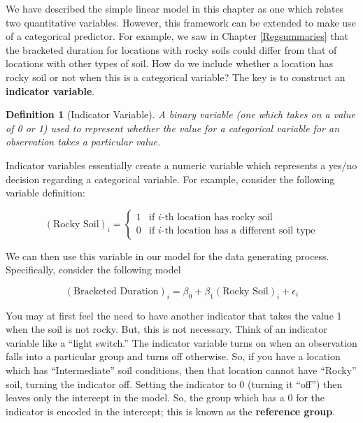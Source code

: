 \documentclass[
]{book}
\theoremstyle{plain}
\theoremstyle{mydefn}
\newtheorem{definition}{Definition}[chapter]
\theoremstyle{myexmpl}
\theoremstyle{remark}
\begin{document}
We have described the simple linear model in this chapter as one which relates two quantitative variables. However, this framework can be extended to make use of a categorical predictor. For example, we saw in Chapter \ref{Regsummaries} that the bracketed duration for locations with rocky soils could differ from that of locations with other types of soil. How do we include whether a location has rocky soil or not when this is a categorical variable? The key is to construct an \textbf{indicator variable}.

\begin{definition}[Indicator Variable]
\protect\hypertarget{def:defn-indicator-variable}{}{\label{def:defn-indicator-variable} {} }A binary variable (one which takes on a value of 0 or 1) used to represent whether the value for a categorical variable for an observation takes a particular value.
\end{definition}

Indicator variables essentially create a numeric variable which represents a yes/no decision regarding a categorical variable. For example, consider the following variable definition:

\[
(\text{Rocky Soil})_i = \begin{cases} 1 & \text{if } i\text{-th location has rocky soil} \\
0 & \text{if } i\text{-th location has a different soil type} \end{cases}
\]

We can then use this variable in our model for the data generating process. Specifically, consider the following model

\begin{equation}
  (\text{Bracketed Duration})_i = \beta_0 + \beta_1(\text{Rocky Soil})_i + \epsilon_i  
  \label{eq:regmodel-ind}
\end{equation}

You may at first feel the need to have another indicator that takes the value 1 when the soil is not rocky. But, this is not necessary. Think of an indicator variable like a ``light switch.'' The indicator variable turns on when an observation falls into a particular group and turns off otherwise. So, if you have a location which has ``Intermediate'' soil conditions, then that location cannot have ``Rocky'' soil, turning the indicator off. Setting the indicator to 0 (turning it ``off'') then leaves only the intercept in the model. So, the group which has a 0 for the indicator is encoded in the intercept; this is known as the \textbf{reference group}.
\end{document}
